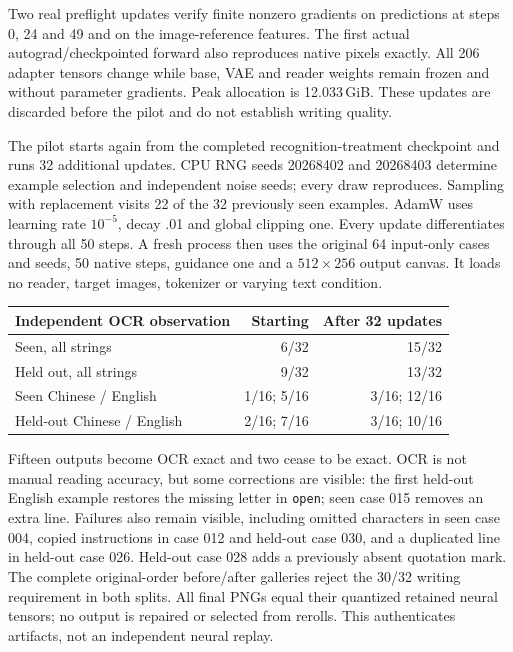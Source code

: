 Two real preflight updates verify finite nonzero gradients on predictions
at steps 0, 24 and 49 and on the image-reference features. The first actual
autograd/checkpointed forward also reproduces native pixels exactly. All
206 adapter tensors change while base, VAE and reader weights remain frozen
and without parameter gradients. Peak allocation is 12.033\,GiB. These
updates are discarded before the pilot and do not establish writing quality.

The pilot starts again from the completed recognition-treatment checkpoint
and runs 32 additional updates. CPU RNG seeds 20268402 and 20268403 determine
example selection and independent noise seeds; every draw reproduces.
Sampling with replacement visits 22 of the 32 previously seen examples.
AdamW uses learning rate $10^{-5}$, decay .01 and global clipping one.
Every update differentiates through all 50 steps. A fresh process then uses
the original 64 input-only cases and seeds, 50 native steps, guidance one
and a $512\times256$ output canvas. It loads no reader, target images,
tokenizer or varying text condition.

\begin{center}\small
\begin{tabular}{lrr}
\toprule
Independent OCR observation & Starting & After 32 updates\\
\midrule
Seen, all strings & 6/32 & 15/32\\
Held out, all strings & 9/32 & 13/32\\
Seen Chinese / English & 1/16; 5/16 & 3/16; 12/16\\
Held-out Chinese / English & 2/16; 7/16 & 3/16; 10/16\\
\bottomrule
\end{tabular}
\end{center}

Fifteen outputs become OCR exact and two cease to be exact. OCR is not
manual reading accuracy, but some corrections are visible: the first
held-out English example restores the missing letter in \texttt{open}; seen
case 015 removes an extra line. Failures also remain visible, including
omitted characters in seen case 004, copied instructions in case 012 and
held-out case 030, and a duplicated line in held-out case 026. Held-out case
028 adds a previously absent quotation mark. The complete original-order
before/after galleries reject the 30/32 writing requirement in both splits.
All final PNGs equal their quantized retained neural tensors; no output is
repaired or selected from rerolls. This authenticates artifacts, not an
independent neural replay.

